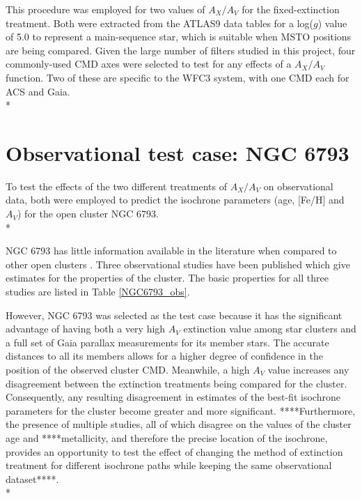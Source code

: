 \documentclass[12pt, a4paper]{report}
\begin{document}
This procedure was employed for two values of $A_{X}/A_{V}$ for the fixed-extinction treatment. Both were extracted from the ATLAS9 data tables for a log($g$) value of 5.0 to represent a main-sequence star, which is suitable when MSTO positions are being compared. Given the large number of filters studied in this project, four commonly-used CMD axes were selected to test for any effects of a $A_{X}/A_{V}$ function. Two of these are specific to the WFC3 system, with one CMD each for ACS and Gaia.\\*

\section{Observational test case: NGC 6793} \label{obs_ngc_section}
To test the effects of the two different treatments of $A_{X}/A_{V}$ on observational data, both were employed to predict the isochrone parameters (age, [Fe/H] and $A_{V}$) for the open cluster NGC 6793.\\*

NGC 6793 has little information available in the literature when compared to other open clusters \citep{2019A&A...623A.108B}. Three observational studies have been published which give estimates for the properties of the cluster. The basic properties for all three studies are listed in Table \ref{NGC6793_obs}.


However, NGC 6793 was selected as the test case because it has the significant advantage of having both a very high $A_{V}$ extinction value among star clusters and a full set of Gaia parallax measurements for its member stars. The accurate distances to all its members allows for a higher degree of confidence in the position of the observed cluster CMD. Meanwhile, a high $A_{V}$ value increases any disagreement between the extinction treatments being compared for the cluster. Consequently, any resulting disagreement in estimates of the best-fit isochrone parameters for the cluster become greater and more significant. ****Furthermore, the presence of multiple studies, all of which disagree on the values of the cluster age and ****metallicity, and therefore the precise location of the isochrone, provides an opportunity to test the effect of changing the method of extinction treatment for different isochrone paths while keeping the same observational dataset****.  \\*
\end{document}
